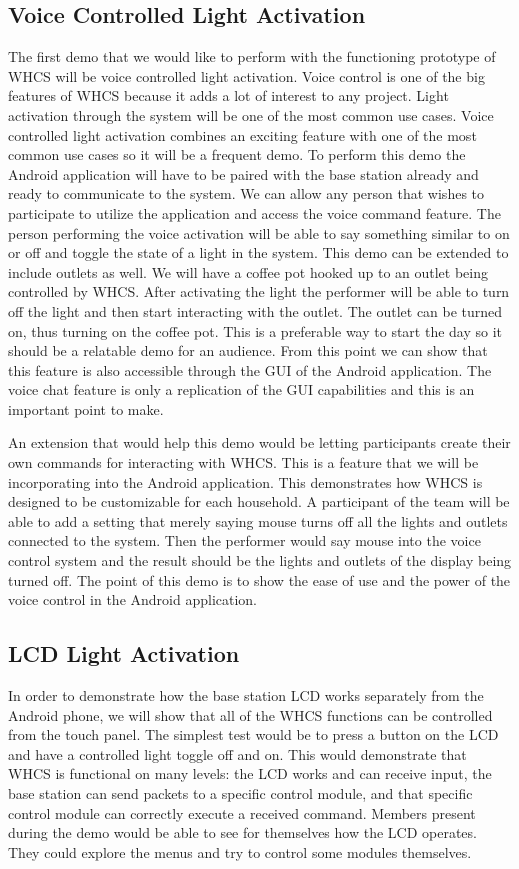 \subsection{Voice Controlled Light Activation}
The first demo that we would like to perform with the functioning prototype of
WHCS will be voice controlled light activation. Voice control is one of the big
features of WHCS because it adds a lot of interest to any project. Light
activation through the system will be one of the most common use cases. Voice
controlled light activation combines an exciting feature with one of the most
common use cases so it will be a frequent demo. To perform this demo the
Android application will have to be paired with the base station already and
ready to communicate to the system. We can allow any person that wishes to
participate to utilize the application and access the voice command feature.
The person performing the voice activation will be able to say something
similar to on or off and toggle the state of a light in the system. This demo
can be extended to include outlets as well. We will have a coffee pot hooked up
to an outlet being controlled by WHCS. After activating the light the performer
will be able to turn off the light and then start interacting with the outlet.
The outlet can be turned on, thus turning on the coffee pot. This is a
preferable way to start the day so it should be a relatable demo for an
audience. From this point we can show that this feature is also accessible
through the GUI of the Android application. The voice chat feature is only a
replication of the GUI capabilities and this is an important point to make.

An extension that would help this demo would be letting participants create
their own commands for interacting with WHCS. This is a feature that we will be
incorporating into the Android application. This demonstrates how WHCS is
designed to be customizable for each household. A participant of the team will
be able to add a setting that merely saying mouse turns off all the lights and
outlets connected to the system. Then the performer would say mouse into the
voice control system and the result should be the lights and outlets of the
display being turned off. The point of this demo is to show the ease of use and
the power of the voice control in the Android application.

\subsection{LCD Light Activation}
In order to demonstrate how the base station LCD works separately from the
Android phone, we will show that all of the WHCS functions can be controlled
from the touch panel. The simplest test would be to press a button on the LCD
and have a controlled light toggle off and on. This would demonstrate that WHCS
is functional on many levels: the LCD works and can receive input, the base
station can send packets to a specific control module, and that specific
control module can correctly execute a received command.  Members present
during the demo would be able to see for themselves how the LCD operates. They
could explore the menus and try to control some modules themselves.

